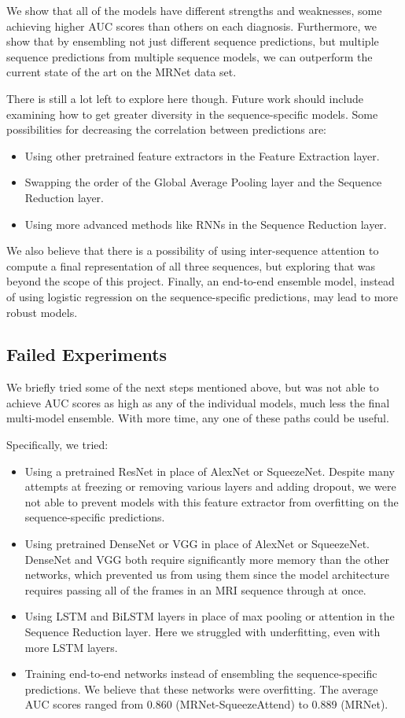 \documentclass[conference]{IEEEtran}
\begin{document}
We show that all of the models have different strengths and weaknesses, some achieving higher AUC scores than others on each diagnosis. Furthermore, we show that by ensembling not just different sequence predictions, but multiple sequence predictions from multiple sequence models, we can outperform the current state of the art on the MRNet data set.

There is still a lot left to explore here though. Future work should include examining how to get greater diversity in the sequence-specific models. Some possibilities for decreasing the correlation between predictions are:
\begin{itemize}
\item Using other pretrained feature extractors in the Feature Extraction layer.
\item Swapping the order of the Global Average Pooling layer and the Sequence
Reduction layer.
\item Using more advanced methods like RNNs in the Sequence Reduction layer.
\end{itemize}

We also believe that there is a possibility of using inter-sequence attention to compute a final representation of all three sequences, but exploring that was beyond the scope of this project. Finally, an end-to-end ensemble model, instead of using logistic regression on the sequence-specific predictions, may lead to more robust models.

\subsection{Failed Experiments}
We briefly tried some of the next steps mentioned above, but was not able to achieve AUC scores as high as any of the individual models, much less the final multi-model ensemble. With more time, any one of these paths could be useful.

Specifically, we tried:
\begin{itemize}
   \item Using a pretrained ResNet in place of AlexNet or SqueezeNet. Despite many attempts at freezing or removing various layers and adding dropout, we were not able to prevent models with this feature extractor from overfitting on the sequence-specific predictions.
   \item Using pretrained DenseNet or VGG in place of AlexNet or SqueezeNet. DenseNet and VGG both require significantly more memory than the other networks, which prevented us from using them since the model architecture requires passing all of the frames in an MRI sequence through at once.
   \item Using LSTM and BiLSTM layers in place of max pooling or attention in the Sequence Reduction layer. Here we struggled with underfitting, even with more LSTM layers.
   \item Training end-to-end networks instead of ensembling the sequence-specific predictions. We believe that these networks were overfitting. The average AUC scores ranged from 0.860 (MRNet-SqueezeAttend) to 0.889 (MRNet).
\end{itemize}



\end{document}
